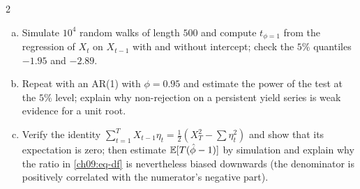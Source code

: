 \begin{paracol}{2}
\begin{exercise}\label{ch09:ex-x-df}
\leavevmode
\begin{enumerate}[(a)]
  \item Simulate $10^4$ random walks of length $500$ and compute $t_{\phi=1}$ from the regression of $X_t$ on $X_{t-1}$ with and without intercept; check the $5\%$ quantiles $-1.95$ and $-2.89$.
  \item Repeat with an AR(1) with $\phi=0.95$ and estimate the power of the test at the $5\%$ level; explain why
      non-rejection on a persistent yield series is weak evidence for a unit root.
  \item Verify the identity $\sum_{t=1}^TX_{t-1}\eta_t=\frac12(X_T^2-\sum\eta_t^2)$ and show that its expectation is zero; then estimate $\mathbb{E}[T(\hat\phi-1)]$ by simulation and explain why the ratio in \eqref{ch09:eq-df} is nevertheless biased downwards (the denominator is positively correlated with the numerator's negative part).
\end{enumerate}
\end{exercise}


\end{paracol}
